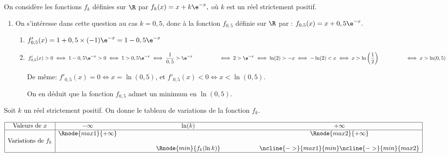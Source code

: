 
On considère les fonctions $f_{k}$ définies sur $\R$ par 
$f_{k}(x) = x + k \e^{-x},$
 où $k$ est un réel strictement positif.

	\begin{enumerate}
		\item On s'intéresse dans cette question au cas $k = 0,5$, donc à la fonction $f_{0,5}$ définie sur $\R$ par : $f_{0,5}(x) = x + 0,5 \e^{-x}.$

\smallskip
	\begin{enumerate}
		\item %
$f'_{0,5}(x)=1+0,5\times(-1)\e^{-x}=1-0,5\e^{-x}$		
		
		\item %
$f'_{0,5}(x) >0
\iff
1-0,5\e^{-x} >0
\iff
1>0,5\e^{-x}
\iff
\dfrac{1}{0,5}>\e^{-x}\\
\phantom{f'_{0,5}(x) >0}
\iff
2>\e^{-x}
\iff
\ln(2)>-x
\iff
-\ln(2)<x
\iff
x>\ln\left (\dfrac{1}{2}\right )\\
\phantom{f'_{0,5}(x) >0}
\iff
x>\ln(0,5)$

De même: $f'_{0,5}(x)=0 \iff x=\ln(0,5)$, et $f'_{0,5}(x)<0 \iff x<\ln(0,5)$.

On en déduit que la fonction $f_{0,5}$ admet un minimum en $\ln(0,5)$.
	\end{enumerate}
\end{enumerate}

Soit $k$ un réel strictement positif. On donne le tableau de variations de la fonction $f_{k}$.
\medskip

\begin{center}
{\renewcommand{\arraystretch}{1.3}
\def\esp{\hspace*{1.5cm}}%
\def\hauteur{0pt}%
$\begin{array}{|c| *4{c} c|}
\hline
 \text{Valeurs de } x & -\infty & \esp & \ln(k) & \esp & +\infty \\
\hline
  & \Rnode{max1}{+\infty}  &  &  &  & \Rnode{max2}{+\infty}   \\
\text{Variations de } f_k & &  & & &  \rule{0pt}{\hauteur} \\
 &  & &   \Rnode{min}{f_k(\ln k)} & & \rule{0pt}{\hauteur}
\ncline{->}{max1}{min} \ncline{->}{min}{max2}\\
\hline
\end{array}$
\renewcommand{\arraystretch}{1}}
\end{center}

